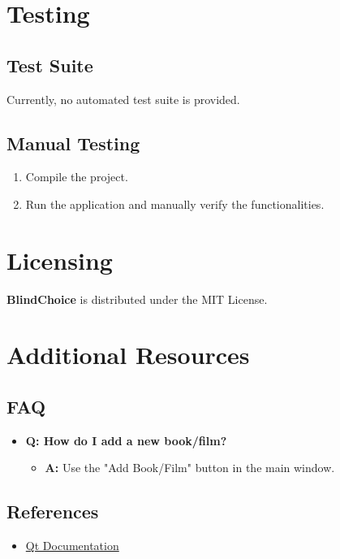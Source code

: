 \documentclass{article}
\begin{document}
\section{Testing}

\subsection{Test Suite}
Currently, no automated test suite is provided.

\subsection{Manual Testing}
\begin{enumerate}
    \item Compile the project.
    \item Run the application and manually verify the functionalities.
\end{enumerate}

\section{Licensing}

\textbf{BlindChoice} is distributed under the MIT License. 

\section{Additional Resources}

\subsection{FAQ}
\begin{itemize}
    \item \textbf{Q: How do I add a new book/film?}
    \begin{itemize}
        \item \textbf{A:} Use the "Add Book/Film" button in the main window.
    \end{itemize}
\end{itemize}

\subsection{References}
\begin{itemize}
    \item \href{https://doc.qt.io/}{Qt Documentation}
\end{itemize}
\end{document}
